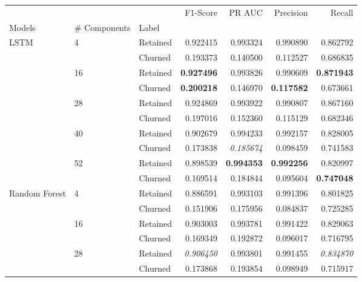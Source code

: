 \documentclass{kththesis}
\begin{document}

\begin{table}
\centering
\begin{tabular}{lllrrrr}
\toprule
     &   &          &  F1-Score &    PR AUC &  Precision &    Recall \\
Models & \# Components & Label &           &           &            &           \\
\midrule
\multirow{10}{*}{LSTM} & \multirow{2}{*}{4} & Retained &  0.922415 &  0.993324 &   0.990890 &  0.862792 \\
     &   & Churned &  0.193373 &  0.140500 &   0.112527 &  0.686835 \\
\cline{2-7}
     & \multirow{2}{*}{16} & Retained &  \textbf{0.927496} &  0.993826 &   0.990609 &  \textbf{0.871943} \\
     &   & Churned &  \textbf{0.200218} &  0.146970 &   \textbf{0.117582} &  0.673661 \\
\cline{2-7}
     & \multirow{2}{*}{28} & Retained &  0.924869 &  0.993922 &   0.990807 &  0.867160 \\
     &   & Churned &  0.197016 &  0.152360 &   0.115129 &  0.682346 \\
\cline{2-7}
     & \multirow{2}{*}{40} & Retained &  0.902679 &  0.994233 &   0.992157 &  0.828005 \\
     &   & Churned &  0.173838 &  \textit{0.185674} &   0.098459 &  0.741583 \\
\cline{2-7}
     & \multirow{2}{*}{52} & Retained &  0.898539 &  \textbf{0.994353} &   \textbf{0.992256} &  0.820997 \\
     &   & Churned &  0.169514 &  0.184844 &   0.095604 &  \textbf{0.747048} \\
\cline{1-7}
\cline{2-7}
\multirow{10}{*}{Random Forest} & \multirow{2}{*}{4} & Retained &  0.886591 &  0.993103 &   0.991396 &  0.801825 \\
     &   & Churned &  0.151906 &  0.175956 &   0.084837 &  0.725285 \\
\cline{2-7}
     & \multirow{2}{*}{16} & Retained &  0.903003 &  0.993781 &   0.991422 &  0.829063 \\
     &   & Churned &  0.169349 &  0.192872 &   0.096017 &  0.716795 \\
\cline{2-7}
     & \multirow{2}{*}{28} & Retained &  \textit{0.906450} &  0.993801 &   0.991455 &  \textit{0.834870} \\
     &   & Churned &  0.173868 &  0.193854 &   0.098949 &  0.715917 \\

\end{tabular}
\end{table}
\end{document}
